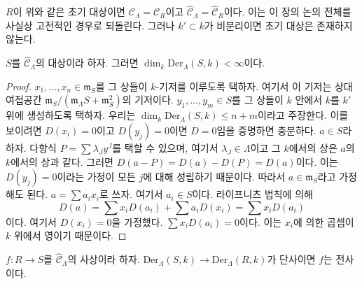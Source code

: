 \medskip\noindent
$R$이 위와 같은 초기 대상이면
$\mathcal{C}_\Lambda = \mathcal{C}_R$이고
$\widehat{\mathcal{C}}_\Lambda = \widehat{\mathcal{C}}_R$이다.
이는 이 장의 논의 전체를 사실상 고전적인 경우로 되돌린다.
그러나 $k' \subset k$가 비분리이면 초기 대상은 존재하지 않는다.

\begin{lemma}
\label{lemma-derivations-finite}
$S$를 $\widehat{\mathcal{C}}_\Lambda$의 대상이라 하자.
그러면 $\dim_k \text{Der}_\Lambda(S, k) < \infty$이다.
\end{lemma}

\begin{proof}
$x_1, \ldots, x_n \in \mathfrak m_S$를 그 상들이 $k$-기저를
이루도록 택하자. 여기서 이 기저는 상대 여접공간
$\mathfrak m_S/(\mathfrak m_\Lambda S + \mathfrak m_S^2)$의 기저이다.
$y_1, \ldots, y_m \in S$를 그 상들이 $k$ 안에서 $k$를
$k'$ 위에 생성하도록 택하자. 우리는
$\dim_k \text{Der}_\Lambda(S, k) \leq n + m$이라고 주장한다.
이를 보이려면 $D(x_i) = 0$이고 $D(y_j) = 0$이면
$D = 0$임을 증명하면 충분하다. $a \in S$라 하자.
다항식 $P = \sum \lambda_J y^J$를 택할 수 있으며,
여기서 $\lambda_J \in \Lambda$이고 그 $k$에서의 상은
$a$의 $k$에서의 상과 같다. 그러면
$D(a - P) = D(a) - D(P) = D(a)$이다. 이는
$D(y_j) = 0$이라는 가정이 모든 $j$에 대해 성립하기 때문이다. 따라서
$a \in \mathfrak m_S$라고 가정해도 된다.
$a = \sum a_i x_i$로 쓰자. 여기서 $a_i \in S$이다.
라이프니츠 법칙에 의해
$$
D(a) = \sum x_iD(a_i) + \sum a_iD(x_i) = \sum x_iD(a_i)
$$
이다. 여기서 $D(x_i) = 0$을 가정했다.
$\sum x_iD(a_i) = 0$이다. 이는 $x_i$에 의한 곱셈이
$k$ 위에서 영이기 때문이다.
\end{proof}

\begin{lemma}
\label{lemma-derivations-surjective}
$f : R \to S$를 $\widehat{\mathcal{C}}_\Lambda$의 사상이라 하자.
$\text{Der}_\Lambda(S, k) \to \text{Der}_\Lambda(R, k)$가 단사이면
$f$는 전사이다.
\end{lemma}

